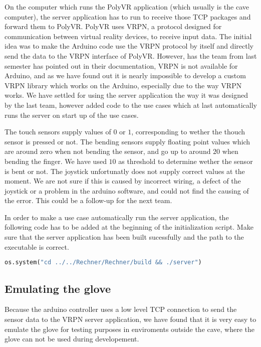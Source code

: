On the computer which runs the PolyVR application (which usually is the cave computer), the server application has to run to receive those TCP packages and forward them to PolyVR. PolyVR uses VRPN, a protocol designed for communication between virtual reality devices, to receive input data. The initial idea was to make the Arduino code use the VRPN protocol by itself and directly send the data to the VRPN interface of PolyVR. However, has the team from last semester has pointed out in their documentation, VRPN is not available for Arduino, and as we have found out it is nearly impossible to develop a custom VRPN library which works on the Arduino, especially due to the way VRPN works. We have settled for using the server application the way it was designed by the last team, however added code to the use cases which at last automatically runs the server on start up of the use cases.

The touch sensors supply values of $0$ or $1$, corresponding to wether the thouch sensor is pressed or not. The bending sensors supply floating point values which are around zero when not bending the sensor, and go up to around $20$ when bending the finger. We have used $10$ as threshold to determine wether the sensor is bent or not. The joystick unfortunatly does not supply correct values at the moment. We are not sure if this is caused by incorrect wiring, a defect of the joystick or a problem in the arduino software, and could not find the causing of the error. This could be a follow-up for the next team.

In order to make a use case automatically run the server application, the following code has to be added at the beginning of the initialization script. Make sure that the server application has been built sucessfully and the path to the executable is correct.

\begin{lstlisting}[language=python]
os.system("cd ../../Rechner/Rechner/build && ./server")
\end{lstlisting}

\subsection{Emulating the glove}

Because the arduino controller uses a low level TCP connection to send the sensor data to the VRPN server application, we have found that it is very easy to emulate the glove for testing purposes in enviroments outside the cave, where the glove can not be used during developement.

